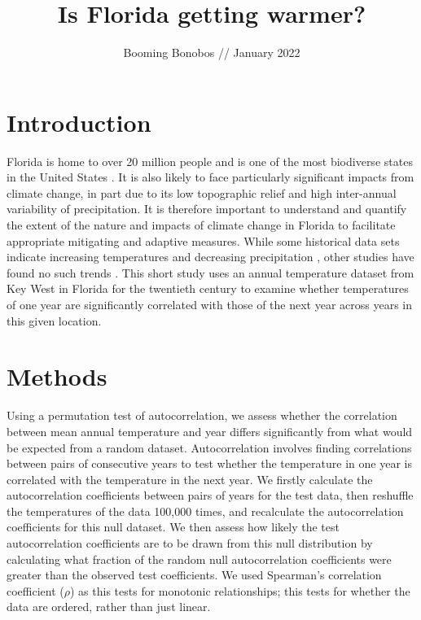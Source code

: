 \documentclass{article}
\title{\textbf{Is Florida getting warmer?\vspace{-0.5em}}}
\author{Booming Bonobos // January 2022}
\date{}
\begin{document}
\maketitle

\section{Introduction \vspace{-0.5em}}

Florida is home to over 20 million people and is one of the most biodiverse states in the United States \cite{usda}. 
It is also likely to face particularly significant impacts from climate change, in part due to its low topographic 
relief and high inter-annual variability of precipitation. It is therefore important to understand and quantify the 
extent of the nature and impacts of climate change in Florida to facilitate appropriate mitigating and adaptive measures. 
While some historical data sets indicate increasing temperatures and decreasing precipitation \cite{irizarry2013historical}, 
other studies have found no such trends \cite{obeysekera2011climate}. This short study uses an annual temperature dataset 
from Key West in Florida for the twentieth century to examine whether temperatures of one year are significantly 
correlated with those of the next year across years in this given location. \vspace{-1em}

\section{Methods \vspace{-0.5em}}

Using a permutation test of autocorrelation, we assess whether the correlation between mean annual temperature and year 
differs significantly from what would be expected from a random dataset. Autocorrelation involves finding correlations 
between pairs of consecutive years to test whether the temperature in one year is correlated with the temperature in the 
next year. We firstly calculate the autocorrelation coefficients between pairs of years for the test data, then reshuffle 
the temperatures of the data 100,000 times, and recalculate the autocorrelation coefficients for this null dataset. We 
then assess how likely the test autocorrelation coefficients are to be drawn from this null distribution by calculating 
what fraction of the random null autocorrelation coefficients were greater than the observed test coefficients. We used 
Spearman's correlation coefficient ($\rho$) as this tests for monotonic relationships; this tests for whether the data are 
ordered, rather than just linear. \vspace{-1em}
\end{document}
